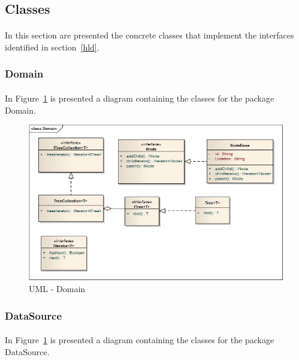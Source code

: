 \documentclass[a4paper,10pt]{article}
\begin{document}
\subsection{Classes}
  
\paragraph{}
In this section are presented the concrete classes that implement the interfaces identified in section~\ref{hld}.

\subsubsection{Domain}
\paragraph{}
In Figure~\ref{uml:Domain} is presented a diagram containing the classes for the package Domain.

  \begin{figure}
  \centering
  \includegraphics[scale=0.5]{images/Domain.jpg}  
  \caption{UML - Domain}
  \label{uml:Domain}
  \end{figure} 

\subsubsection{DataSource}
\paragraph{}
In Figure~\ref{uml:Domain} is presented a diagram containing the classes for the package DataSource.
\end{document}
